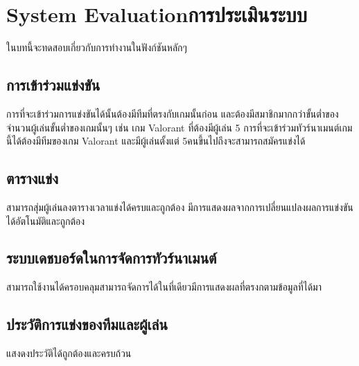 \chapter{\ifenglish System Evaluation\else การประเมินระบบ\fi}

ในบทนี้จะทดสอบเกี่ยวกับการทำงานในฟังก์ชันหลักๆ

\section{การเข้าร่วมแข่งขัน}
การที่จะเข้าร่วมการแข่งขันได้นั้นต้องมีทีมที่ตรงกับเกมนั้นก่อน และต้องมีสมาชิกมากกว่าขั้นต่ำของจำนวนผู้เล่นขั้นต่ำของเกมนั้นๆ เช่น
เกม Valorant ที่ต้องมีผู้เล่น 5 การที่จะเข้าร่วมทัวร์นาเมนต์เกมนี้ได้ต้องมีทีมของเกม Valorant และมีผู้เล่นตั้งแต่ 5คนขึ้นไปถึงจะสามารถสมัครแข่งได้
\section{ตารางแข่ง}
สามารถสุ่มผู้เล่นลงตารางเวลาแข่งได้ครบและถูกต้อง มีการแสดงผลจากการเปลี่ยนแปลงผลการแข่งขันได้อัตโนมัติและถูกต้อง
\section{ระบบเดชบอร์ดในการจัดการทัวร์นาเมนต์}
สามารถใช้งานได้ครอบคลุมสามารถจัดการได้ในที่เดียวมีการแสดงผลที่ตรงกตามข้อมูลที่ได้มา
\section{ประวัติการแข่งของทีมและผู้เล่น}
แสงดงประวัติได้ถูกต้องและครบถ้วน

